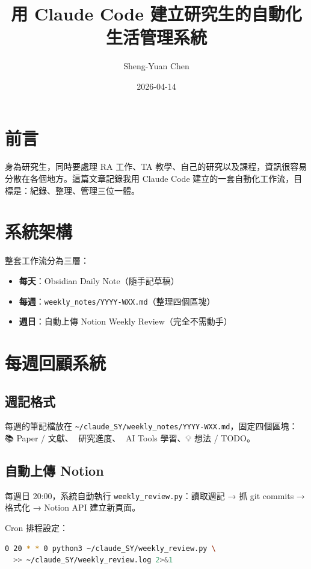 \documentclass[12pt, a4paper]{article}
\title{用 Claude Code 建立研究生的自動化生活管理系統}
\author{Sheng-Yuan Chen}
\date{2026-04-14}
\begin{document}
\maketitle

\section*{前言}

身為研究生，同時要處理 RA 工作、TA 教學、自己的研究以及課程，資訊很容易分散在各個地方。這篇文章記錄我用 Claude Code 建立的一套自動化工作流，目標是：紀錄、整理、管理三位一體。

\section{系統架構}

整套工作流分為三層：

\begin{itemize}
  \item \textbf{每天}：Obsidian Daily Note（隨手記草稿）
  \item \textbf{每週}：\texttt{weekly\_notes/YYYY-WXX.md}（整理四個區塊）
  \item \textbf{週日}：自動上傳 Notion Weekly Review（完全不需動手）
\end{itemize}

\section{每週回顧系統}

\subsection{週記格式}

每週的筆記檔放在 \texttt{\textasciitilde/claude\_SY/weekly\_notes/YYYY-WXX.md}，固定四個區塊：
📚 Paper / 文獻、🔬 研究進度、🤖 AI Tools 學習、💡 想法 / TODO。

\subsection{自動上傳 Notion}

每週日 20:00，系統自動執行 \texttt{weekly\_review.py}：讀取週記 → 抓 git commits → 格式化 → Notion API 建立新頁面。

Cron 排程設定：

\begin{lstlisting}[language=bash]
0 20 * * 0 python3 ~/claude_SY/weekly_review.py \
  >> ~/claude_SY/weekly_review.log 2>&1
\end{lstlisting}
\end{document}
